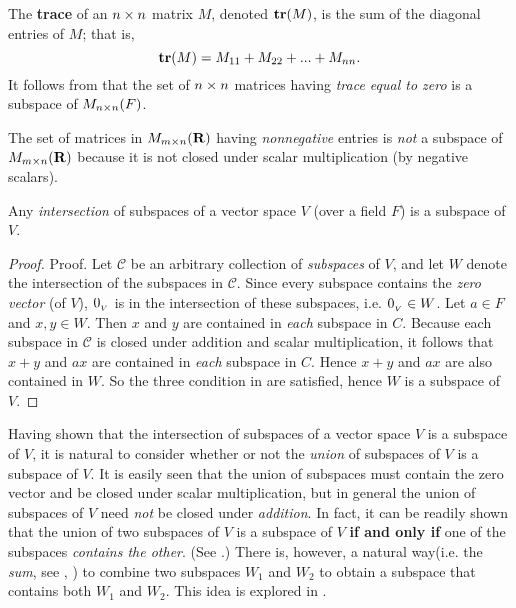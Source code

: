 \begin{example} \label{example 1.3.4}
The \textbf{trace} of an \(n \times n\) matrix \(M\), denoted \(\textbf{tr}(M)\), is the sum of the diagonal entries of \(M\);
that is,
\[
    \textbf{tr}(M) = M_{11} + M_{22} + ... + M_{nn}.
\]
It follows from  that the set of \(n \times n\) matrices having \emph{trace equal to zero} is a subspace of \(M_{n \times n}(F)\).
\end{example}

\begin{example} \label{example 1.3.5}
The set of matrices in \(M_{m \times n}(\mathbf{R})\) having \emph{nonnegative} entries is \emph{not} a subspace of \(M_{m \times n}(\mathbf{R})\) because it is not closed under scalar multiplication (by negative scalars).
\end{example}

\begin{theorem} \label{thm 1.4}
Any \emph{intersection} of subspaces of a vector space \(V\) (over a field \(F\)) is a subspace of \(V\).
\end{theorem}

\begin{proof}
Proof. Let \(\mathcal{C}\) be an arbitrary collection of \emph{subspaces} of \(V\), and let \(W\) denote the intersection of the subspaces in \(\mathcal{C}\).
Since every subspace contains the \emph{zero vector} (of \(V\)), \(0_{_V}\) is in the intersection of these subspaces, i.e. \(0_{_V} \in W\).
Let \(a \in F\) and \(x, y \in W\).
Then \(x\) and \(y\) are contained in \emph{each} subspace in \(C\). Because each subspace in \(\mathcal{C}\) is closed under addition and scalar multiplication, it follows that \(x + y\) and \(ax\) are contained in \emph{each} subspace in \(C\).
Hence \(x + y\) and \(ax\) are also contained in \(W\).
So the three condition in  are satisfied, hence \(W\) is a subspace of \(V\).
\end{proof}

Having shown that the intersection of subspaces of a vector space \(V\) is a subspace of \(V\), it is natural to consider whether or not the \emph{union} of subspaces of \(V\) is a subspace of \(V\).
It is easily seen that the union of subspaces must contain the zero vector and be closed under scalar multiplication, but in general the union of subspaces of \(V\) need \emph{not} be closed under \emph{addition}.
In fact, it can be readily shown that the union of two subspaces of \(V\) is a subspace of \(V\) \textbf{if and only if} one of the subspaces \emph{contains the other}. (See .)
There is, however, a natural way(i.e. the \emph{sum}, see , )  to combine two subspaces \(W_1\) and \(W_2\) to obtain a subspace that contains both \(W_1\) and \(W_2\).
This idea is explored in .
